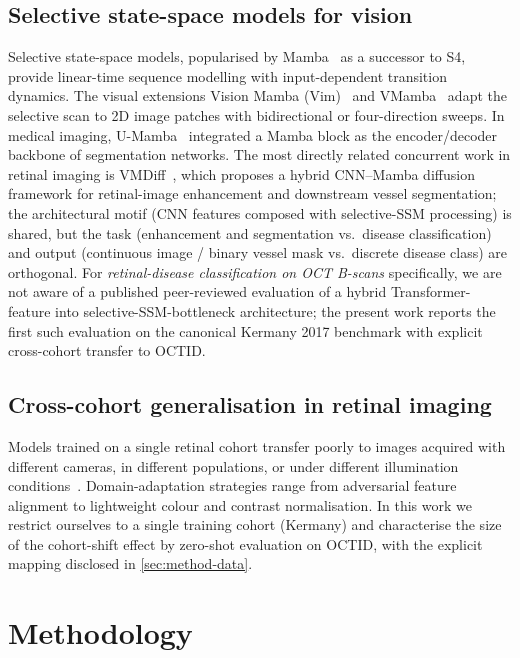 \documentclass[5p]{elsarticle}
\begin{document}
\subsection{Selective state-space models for vision}
Selective state-space models, popularised by Mamba~\citep{gu2023mamba} as a successor to S4, provide linear-time sequence modelling with input-dependent transition dynamics. The visual extensions Vision Mamba (Vim)~\citep{zhu2024vim} and VMamba~\citep{liu2024vmamba} adapt the selective scan to 2D image patches with bidirectional or four-direction sweeps. In medical imaging, U-Mamba~\citep{ma2024umamba} integrated a Mamba block as the encoder/decoder backbone of segmentation networks. The most directly related concurrent work in retinal imaging is VMDiff~\citep{chan2026vmdiff}, which proposes a hybrid CNN--Mamba diffusion framework for retinal-image enhancement and downstream vessel segmentation; the architectural motif (CNN features composed with selective-SSM processing) is shared, but the task (enhancement and segmentation vs.\ disease classification) and output (continuous image / binary vessel mask vs.\ discrete disease class) are orthogonal. For \emph{retinal-disease classification on OCT B-scans} specifically, we are not aware of a published peer-reviewed evaluation of a hybrid Transformer-feature into selective-SSM-bottleneck architecture; the present work reports the first such evaluation on the canonical Kermany 2017 benchmark with explicit cross-cohort transfer to OCTID.

\subsection{Cross-cohort generalisation in retinal imaging}
Models trained on a single retinal cohort transfer poorly to images acquired with different cameras, in different populations, or under different illumination conditions~\citep{wang2020domain}. Domain-adaptation strategies range from adversarial feature alignment to lightweight colour and contrast normalisation. In this work we restrict ourselves to a single training cohort (Kermany) and characterise the size of the cohort-shift effect by zero-shot evaluation on OCTID, with the explicit mapping disclosed in \cref{sec:method-data}.


\section{Methodology}
\label{sec:method}
\end{document}
